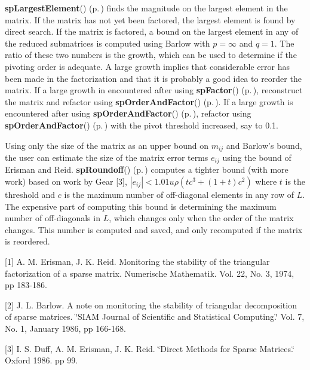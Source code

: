 {\bf sp\-Largest\-Element}() {\rm (p.\,\pageref{spUtils_8c_a22})} finds the magnitude on the largest element in the matrix. If the matrix has not yet been factored, the largest element is found by direct search. If the matrix is factored, a bound on the largest element in any of the reduced submatrices is computed using Barlow with $ p = \infty $ and $ q = 1 $. The ratio of these two numbers is the growth, which can be used to determine if the pivoting order is adequate. A large growth implies that considerable error has been made in the factorization and that it is probably a good idea to reorder the matrix. If a large growth in encountered after using {\bf sp\-Factor}() {\rm (p.\,\pageref{spFactor_8c_a25})}, reconstruct the matrix and refactor using {\bf sp\-Order\-And\-Factor}() {\rm (p.\,\pageref{spFactor_8c_a24})}. If a large growth is encountered after using {\bf sp\-Order\-And\-Factor}() {\rm (p.\,\pageref{spFactor_8c_a24})}, refactor using {\bf sp\-Order\-And\-Factor}() {\rm (p.\,\pageref{spFactor_8c_a24})} with the pivot threshold increased, say to 0.1.

Using only the size of the matrix as an upper bound on $ m_{ij} $ and Barlow's bound, the user can estimate the size of the matrix error terms $ e_{ij} $ using the bound of Erisman and Reid. {\bf sp\-Roundoff}() {\rm (p.\,\pageref{spUtils_8c_a23})}  computes a tighter bound (with more work) based on work by Gear [3], $ |e_{ij}| < 1.01 u \rho (t c^3 + (1 + t)c^2) $ where $ t $ is the threshold and $ c $ is the maximum number of off-diagonal elements in any row of $ L $. The expensive part of computing this bound is determining the maximum number of off-diagonals in $ L $, which changes only when the order of the matrix changes. This number is computed and saved, and only recomputed if the matrix is reordered.

[1] A. M. Erisman, J. K. Reid. Monitoring the stability of the triangular factorization of a sparse matrix. Numerische Mathematik. Vol. 22, No. 3, 1974, pp 183-186.

[2] J. L. Barlow. A note on monitoring the stability of triangular decomposition of sparse matrices. \char`\"{}SIAM Journal of Scientific and Statistical Computing.\char`\"{} Vol. 7, No. 1, January 1986, pp 166-168.

[3] I. S. Duff, A. M. Erisman, J. K. Reid. \char`\"{}Direct Methods for Sparse Matrices.\char`\"{} Oxford 1986. pp 99.

